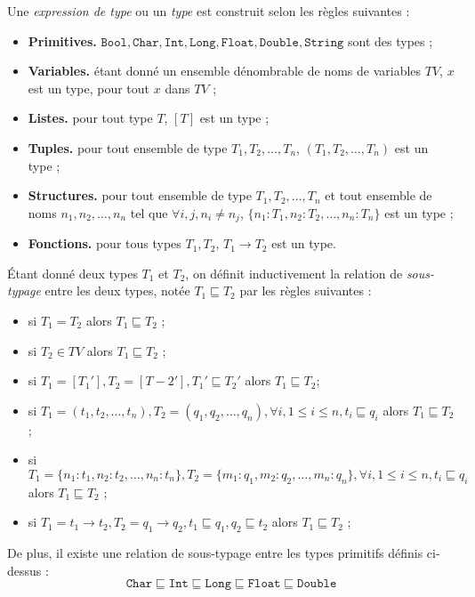 \begin{definition}
Une \emph{expression de type} ou un \emph{type} est construit selon les r\`egles
suivantes :
\begin{itemize}
  \item \textbf{Primitives.} $\mathtt{Bool},\mathtt{Char},\mathtt{Int},\mathtt{Long},\mathtt{Float},\mathtt{Double},\mathtt{String}$ sont des types ;
\item \textbf{Variables.} \'etant donn\'e un ensemble d\'enombrable
  de noms de variables $TV$, $x$ est un type, pour tout $x$ dans $TV$
  ;
\item \textbf{Listes.} pour tout type $T$, $[T]$ est un type ;
\item \textbf{Tuples.} pour tout ensemble de type $T_1,T_2, \dots,
  T_n$, $(T_1,T_2,\dots,T_n)$ est un type ;
\item \textbf{Structures.} pour tout ensemble de type $T_1,T_2, \dots,
  T_n$ et tout ensemble de noms $n_1,n_2,\dots,n_n$ tel que $\forall
  i,j, n_i\neq n_j$, $\{n_1 : T_1,n_2 :
  T_2,\dots,n_n : T_n\}$ est un type ;
\item \textbf{Fonctions.} pour tous types $T_1,T_2$, $T_1 \rightarrow
  T_2$ est un type.
\end{itemize}
\end{definition}

\begin{definition}
\'Etant donn\'e deux types $T_1$ et $T_2$, on d\'efinit
inductivement la relation de \emph{sous-typage} entre les deux types,
not\'ee $T_1\sqsubseteq T_2$ par les r\`egles suivantes :
\begin{itemize}
  \item si $T_1 = T_2$ alors  $T_1 \sqsubseteq T_2$ ;
  \item si $T_2 \in TV$ alors $T_1 \sqsubseteq T_2$ ;
  \item si $T_1 = [T_1'], T_2=[T-2'], T_1' \sqsubseteq T_2'$ alors $T_1
  \sqsubseteq T_2$;
\item si $T_1 = (t_1,t_2,\dots,t_n), T_2=(q_1,q_2,\dots,q_n),
  \forall i, 1\leq i \leq n, t_i\sqsubseteq q_i$ alors  $T_1
  \sqsubseteq T_2$ ;
\item si $T_1 = \{n_1:t_1,n_2:t_2,\dots,n_n:t_n\}, T_2=\{m_1:q_1,m_2:q_2,\dots,m_n:q_n\},
  \forall i, 1\leq i \leq n, t_i\sqsubseteq q_i$ alors  $T_1
  \sqsubseteq T_2$ ;
\item si $T_1 = t_1 \rightarrow t_2, T_2 = q_1 \rightarrow q_2, t_1
  \sqsubseteq q_1, q_2 \sqsubseteq t_2$ alors $T_1
  \sqsubseteq T_2$ ;
\end{itemize}
De plus, il existe une relation de sous-typage entre les types
primitifs d\'efinis ci-dessus :
$$
\mathtt{Char}\sqsubseteq\mathtt{Int}\sqsubseteq\mathtt{Long}\sqsubseteq\mathtt{Float}\sqsubseteq\mathtt{Double}
$$
\end{definition}

